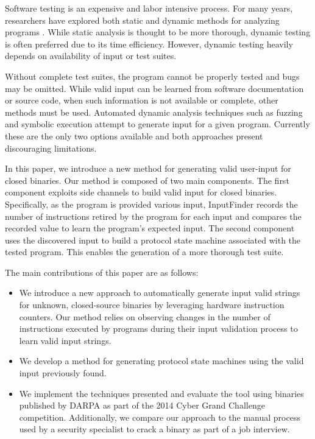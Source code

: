 \documentclass{acm_proc_article-sp}
\def \tool {InputFinder}
\begin{document}
Software testing is an expensive and labor intensive process.
For many years, researchers have explored both static and dynamic methods for analyzing programs \cite{smartfuzzer}.
While static analysis is thought to be more thorough, dynamic testing is often preferred due to its time efficiency.
However, dynamic testing heavily depends on availability of input or test suites.

Without complete test suites, the program cannot be properly tested and bugs may be omitted.
While valid input can be learned from software documentation or source code, when such information is not available or complete, other methods must be used.
Automated dynamic analysis techniques such as fuzzing and symbolic execution attempt to generate input for a given program.
Currently these are the only two options available and both approaches present discouraging limitations.

In this paper, we introduce a new method for generating valid user-input for closed binaries. 
Our method is composed of two main components.
The first component exploits side channels to build valid input for closed binaries.
Specifically, as the program is provided various input, \tool{} records the number of instructions retired by the program for each input and compares the recorded value to learn the program's expected input.
The second component uses the discovered input to build a protocol state machine associated with the tested program.
This enables the generation of a more thorough test suite.


The main contributions of this paper are as follows:
\begin{itemize}
	\item We introduce a new approach to automatically generate input valid strings for unknown, closed-source binaries by leveraging hardware instruction counters. Our method relies on observing changes in the number of instructions executed by programs during their input validation process to learn valid input strings.
	\item We develop a method for generating protocol state machines using the valid input previously found.
	\item We implement the techniques presented and evaluate the tool using binaries published by DARPA as part of the 2014 Cyber Grand Challenge competition. Additionally, we compare our approach to the manual process used by a security specialist to crack a binary as part of a job interview.
\end{itemize}
\end{document}
